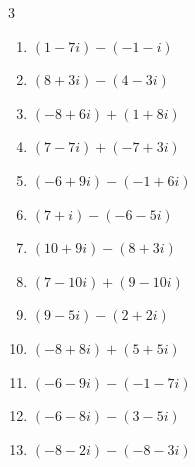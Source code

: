 \begin{multicols}{3}
\begin{enumerate}
        \phantom{$\displaystyle =16$}

  \item $\displaystyle (1-7i) - (-1-i)$

        \phantom{$\displaystyle =2-6i$}

  \item $\displaystyle (8+3i) - (4-3i)$

        \phantom{$\displaystyle =4+6i$}

  \item $\displaystyle (-8+6i) + (1+8i)$

        \phantom{$\displaystyle =-7+14i$}

  \item $\displaystyle (7-7i) + (-7+3i)$

        \phantom{$\displaystyle =-4i$}

  \item $\displaystyle (-6+9i) - (-1+6i)$

        \phantom{$\displaystyle =-5+3i$}

  \item $\displaystyle (7+i) - (-6-5i)$

        \phantom{$\displaystyle =13+6i$}

  \item $\displaystyle (10+9i) - (8+3i)$

        \phantom{$\displaystyle =2+6i$}

  \item $\displaystyle (7-10i) + (9-10i)$

        \phantom{$\displaystyle =16-20i$}

  \item $\displaystyle (9-5i) - (2+2i)$

        \phantom{$\displaystyle =7-7i$}

  \item $\displaystyle (-8+8i) + (5+5i)$

        \phantom{$\displaystyle =-3+13i$}

  \item $\displaystyle (-6-9i) - (-1-7i)$

        \phantom{$\displaystyle =-5-2i$}

  \item $\displaystyle (-6-8i) - (3-5i)$

        \phantom{$\displaystyle =-9-3i$}

\columnbreak %

  \item $\displaystyle (-8-2i) - (-8-3i)$


\end{enumerate}
\end{multicols}
